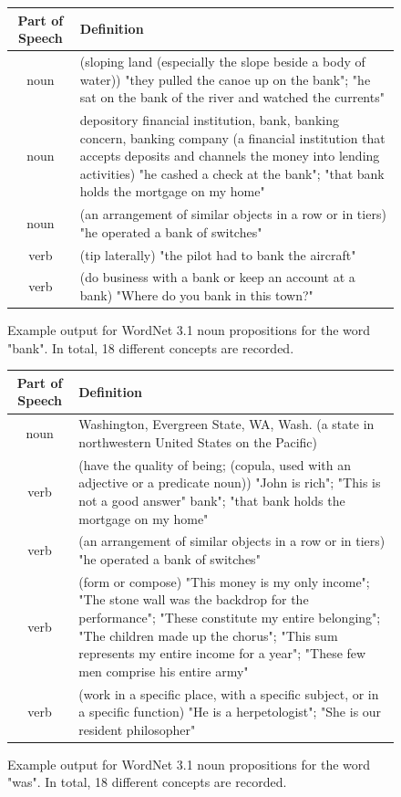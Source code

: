 \documentclass[a4paper,12pt,twoside,openright]{report}
\begin{document}
\begin{figure}[H]
\begin{center}
\begin{tabular}{ | c | p{11cm} | } 
 \hline
 Part of Speech & Definition \\  
 \hline
noun     & (sloping land (especially the slope beside a body of water)) "they pulled the canoe up on the bank"; "he sat on the bank of the river and watched the currents"\\ 
noun     & depository financial institution, bank, banking concern, banking company (a financial institution that accepts deposits and channels the money into lending activities) "he cashed a check at the bank"; "that bank holds the mortgage on my home" \\ 
 noun     & (an arrangement of similar objects in a row or in tiers) "he operated a bank of switches"  \\ 
verb & (tip laterally) "the pilot had to bank the aircraft" \\ 
verb    & (do business with a bank or keep an account at a bank) "Where do you bank in this town?"  \\ 
 \hline
\end{tabular}
\end{center}
\caption{Example output for WordNet 3.1 noun propositions for the word "bank". In total, 18 different concepts are recorded.}
\end{figure}

\begin{figure}[H]
\begin{center}
\begin{tabular}{ | c | p{11cm} | } 
 \hline
 Part of Speech & Definition \\ 
 \hline
noun     & Washington, Evergreen State, WA, Wash. (a state in northwestern United States on the Pacific) \\ 
verb     & (have the quality of being; (copula, used with an adjective or a predicate noun)) "John is rich"; "This is not a good answer"
 bank"; "that bank holds the mortgage on my home" \\ 
 verb     & (an arrangement of similar objects in a row or in tiers) "he operated a bank of switches"  \\ 
verb & (form or compose) "This money is my only income"; "The stone wall was the backdrop for the performance"; "These constitute my entire belonging"; "The children made up the chorus"; "This sum represents my entire income for a year"; "These few men comprise his entire army" \\ 
verb    & (work in a specific place, with a specific subject, or in a specific function) "He is a herpetologist"; "She is our resident philosopher"  \\ 
 \hline
\end{tabular}
\end{center}
\caption{Example output for WordNet 3.1 noun propositions for the word "was". In total, 18 different concepts are recorded.}
\end{figure}
\end{document}

